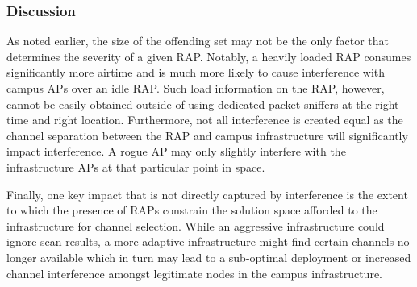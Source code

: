 \subsubsection{Discussion}
\label{subsec:rap_discussion}

As noted earlier, the size of the offending set may not be the only factor that determines
the severity of a given RAP.  Notably, a heavily loaded RAP consumes significantly more
airtime and is much more likely to cause interference with campus APs over an idle RAP.  
Such load information on the RAP, however, cannot be easily obtained outside of using
dedicated packet sniffers at the right time and right location.  Furthermore, not all 
interference is created equal as the channel separation between the
RAP and campus infrastructure will significantly impact interference.  A rogue AP may only
slightly interfere with the infrastructure APs at that particular point in space.  

Finally, one key impact that is not directly captured by interference is the extent to which
the presence of RAPs constrain the solution space afforded to the infrastructure for
channel selection.  While an aggressive infrastructure could ignore scan results, a 
more adaptive infrastructure might find certain channels no longer available which in
turn may lead to a sub-optimal deployment or increased channel interference amongst
legitimate nodes in the campus infrastructure.      


